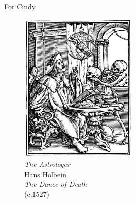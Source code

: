 
\noindent For Cindy

\begin{figure}
    \vspace{50pt}
    \centering
    \includegraphics[width=0.50\textwidth]{assets/holbein-astrologer.jpg}
    \\
    \emph{The Astrologer}
    \\
    Hans Holbein
    \\
    \emph{The Dance of Death}
    \\
    (c.1527)
\end{figure}